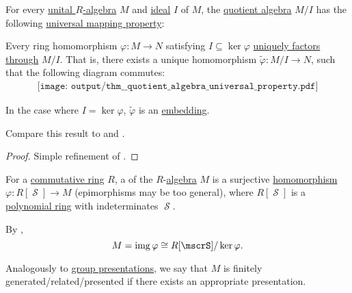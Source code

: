 \begin{theorem}\label{thm:quotient_algebra_universal_property}
  For every \hyperref[def:algebra_over_ring]{unital \( R \)-algebra} \( M \) and \hyperref[def:semiring_ideal]{ideal} \( I \) of \( M \), the \hyperref[def:algebra_over_ring/quotient]{quotient algebra} \( M / I \) has the following \hyperref[rem:universal_mapping_property]{universal mapping property}:
  \begin{displayquote}
    Every ring homomorphism \( \varphi: M \to N \) satisfying \( I \subseteq \ker \varphi \) \hyperref[def:factors_through]{uniquely factors through} \( M / I \). That is, there exists a unique homomorphism \( \widetilde{\varphi}: M / I \to N \), such that the following diagram commutes:
    \begin{equation}\label{eq:thm:quotient_algebra_universal_property/diagram}
      \begin{aligned}
        \texttt{[image: output/thm\_\_quotient\_algebra\_universal\_property.pdf]}
      \end{aligned}
    \end{equation}

    In the case where \( I = \ker \varphi \), \( \widetilde{\varphi} \) is an \hyperref[def:first_order_homomorphism_invertibility/embedding]{embedding}.
  \end{displayquote}

  Compare this result to  and .
\end{theorem}
\begin{proof}
  Simple refinement of .
\end{proof}

\begin{definition}\label{def:algebra_presentation}
  For a \hyperref[def:commutative_ring]{commutative ring} \( R \), a  of the \( R \)-\hyperref[def:algebra_over_ring]{algebra} \( M \) is a surjective \hyperref[def:module/homomorphism]{homomorphism} \( \varphi: R[\mscrS] \to M \) (epimorphisms may be too general), where \( R[\mscrS] \) is a \hyperref[def:polynomial_semiring]{polynomial ring} with indeterminates \( \mscrS \).

  By ,
  \begin{equation*}
    M = \img \varphi \cong R[\mscrS] / \ker \varphi.
  \end{equation*}

  Analogously to \hyperref[def:group_presentation]{group presentations}, we say that \( M \) is finitely generated/related/presented if there exists an appropriate presentation.
\end{definition}

